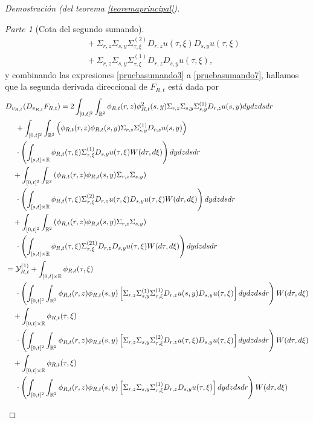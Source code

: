 \documentclass[letterpaper,twoside,12pt]{book}
\newcommand{\R}{\mathbb{R}}
\newcommand{\1}{\mathds{1}}
\theoremstyle{definition}
\theoremstyle{definition}
\theoremstyle{remark}
\newtheorem{proofpart}{Parte}
\theoremstyle{definition}
\theoremstyle{definition}
\theoremstyle{definition}
\theoremstyle{definition}
\theoremstyle{definition}
\begin{document}
\begin{proof}[Demostración (del teorema \ref{teoremaprincipal})]
\begin{proofpart}[Cota del segundo sumando]
\begin{align*}
   &\ \ \ +\Sigma_{r,z}\Sigma_{s,y}\Sigma_{\tau,\xi}^{(2)}D_{r,z}u(\tau,\xi)D_{s,y}u(\tau,\xi)\\
   &\ \ \ +\Sigma_{r,z}\Sigma_{s,y}\Sigma_{\tau,\xi}^{(1)}D_{r,z}D_{s,y}u(\tau,\xi),
\end{align*}
y combinando las expresiones \eqref{pruebasumando3} a \eqref{pruebasumando7}, hallamos que la segunda derivada direccional de $F_{R,t}$ está dada por
\begin{align}
   &D_{v_{R,t}}(D_{v_{R,t}}F_{R,t})=2\int_{[0,t]^2}\int_{\R^2}\phi_{R,t}(r,z)\phi_{R,t}^2(s,y)\Sigma_{r,z}\Sigma_{s,y}\Sigma^{(1)}_{s,y}D_{r,z}u(s,y)dy dz ds dr\notag\\
   &\ \ \ \ + \int _{[0,t]^2}\int_{\R^2}\left(\phi_{R,t}(r,z)\phi_{R,t}(s,y)\Sigma_{r,z}\Sigma_{s,y}^{(1)}D_{r,z}u(s,y)\right)\notag\\
   & \ \ \ \ \cdot \left(\int_{[s,t]\times\R}\phi_{R,t}(\tau,\xi)\Sigma_{\tau,\xi}^{(1)}D_{s,y}u(\tau,\xi)W(d\tau,d\xi)\right)dy dz ds dr\notag\\
   &\ \ \ +\int _{[0,t]^2}\int_{\R^2}\left(\phi_{R,t}(r,z)\phi_{R,t}(s,y)\Sigma_{r,z}\Sigma_{s,y}\right)\notag\\
   &\ \ \ \ \cdot \left(\int_{[s,t]\times\R}\phi_{R,t}(\tau,\xi)\Sigma_{\tau,\xi}^{(2)}D_{r,z}u(\tau,\xi)D_{s,y}u(\tau,\xi)W(d\tau,d\xi)\right)dy dz ds dr\notag\\
   &\ \ \ +\int _{[0,t]^2}\int_{\R^2}\left(\phi_{R,t}(r,z)\phi_{R,t}(s,y)\Sigma_{r,z}\Sigma_{s,y}\right)\notag\\
   &\ \ \ \ \cdot \left(\int_{[s,t]\times\R}\phi_{R,t}(\tau,\xi)\Sigma_{\tau,\xi}^{(21)}D_{r,z}D_{s,y}u(\tau,\xi)W(d\tau,d\xi)\right)dy dz ds dr\notag\\
   &=\mathcal{Y}_{R,t}^{(1)}+\int_{[0,t]\times\R}\phi_{R,t}(\tau,\xi)\notag\\
   & \ \ \ \ \cdot \left(\int_{[0,t]^2}\int_{\R^2}\phi_{R,t}(r,z)\phi_{R,t}(s,y)\left[\Sigma_{r,z}\Sigma_{s,y}^{(1)}\Sigma_{\tau,\xi}^{(1)}D_{r,z}u(s,y)D_{s,y}u(\tau,\xi)\right]dy dz ds dr\right) W(d\tau,d\xi)\notag\\
   &\ \ \ +\int_{[0,t]\times\R}\phi_{R,t}(\tau,\xi)\notag\\
   &\ \ \ \ \cdot\left(\int_{[0,t]^2}\int_{\R^2}\phi_{R,t}(r,z)\phi_{R,t}(s,y)\left[\Sigma_{r,z}\Sigma_{s,y}\Sigma_{\tau,\xi}^{(2)}D_{r,z}u(\tau,\xi)D_{s,y}u(\tau,\xi)\right]dy dz ds dr\right) W(d\tau,d\xi)\notag\\
   &\ \ \ +\int_{[0,t]\times\R}\phi_{R,t}(\tau,\xi)\notag\\
   &\ \ \ \ \cdot\left(\int_{[0,t]^2}\int_{\R^2}\phi_{R,t}(r,z)\phi_{R,t}(s,y)\left[\Sigma_{r,z}\Sigma_{s,y}\Sigma_{\tau,\xi}^{(1)}D_{r,z}D_{s,y}u(\tau,\xi)\right]dy dz ds dr\right) W(d\tau,d\xi)\notag\\

\end{align}
\end{proofpart}
\end{proof}
\end{document}
